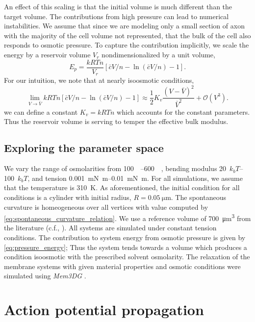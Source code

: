 \documentclass[11pt]{article}
\begin{document}
An effect of this scaling is that the initial volume is much different than the target volume. 
The contributions from high pressure can lead to numerical instabilities. 
We assume that since we are modeling only a small section of axon with the majority of the cell volume not represented, that the bulk of the cell also responds to osmotic pressure.
To capture the contribution implicitly, we scale the energy by a reservoir volume \(V_r\) nondimensionalized by a unit volume,
\begin{equation}
    E_p =\frac{kRTn}{V_r}[\bar{c}V/n - \ln(\bar{c}V/n) -1].
    \label{eq:pressure_energy}
\end{equation}
For our intuition, we note that at nearly isoosmotic conditions,
\begin{equation}
    \lim_{V\to\bar{V}} kRTn[\bar{c}V/n - \ln(\bar{c}V/n) -1] \approx \frac{1}{2}K_v \frac{(V - \bar{V})^2}{\bar{V}^2} + \mathcal{O}(V^3).
\end{equation}
we can define a constant \(K_v = kRTn\) which accounts for the constant parameters.
Thus the reservoir volume is serving to temper the effective bulk modulus.

\subsection{Exploring the parameter space}

We vary the range of osmolarities from \SIrange[]{100}{600}{\milli\osm}, bending modulus \SIrange[]{20}{100}{\(k_bT\)}, and tension \SIrange[]{0.001}{0.01}{\milli\newton\meter}.
For all simulations, we assume that the temperature is \SI{310}{\kelvin}.
As aforementioned, the initial condition for all conditions is a cylinder with initial radius, \(R = \SI{0.05}{\micro\meter}\).
The spontaneous curvature is homeogeneous over all vertices with value computed by \cref{eq:spontaneous_curvature_relation}.
We use a reference volume of \SI{700}{\micro\meter\cubed} from the literature (c.f., \textcite{LarsenEtAl2021}).
All systems are simulated under constant tension conditions.
The contribution to system energy from osmotic pressure is given by \cref{eq:pressure_energy};
Thus the system tends towards a volume which produces a condition isoosmotic with the prescribed solvent osmolarity.
The relaxation of the membrane systems with given material properties and osmotic conditions were simulated using \textit{Mem3DG} \cite{ZhuEtAl2022}.

\section{Action potential propagation}
\end{document}
